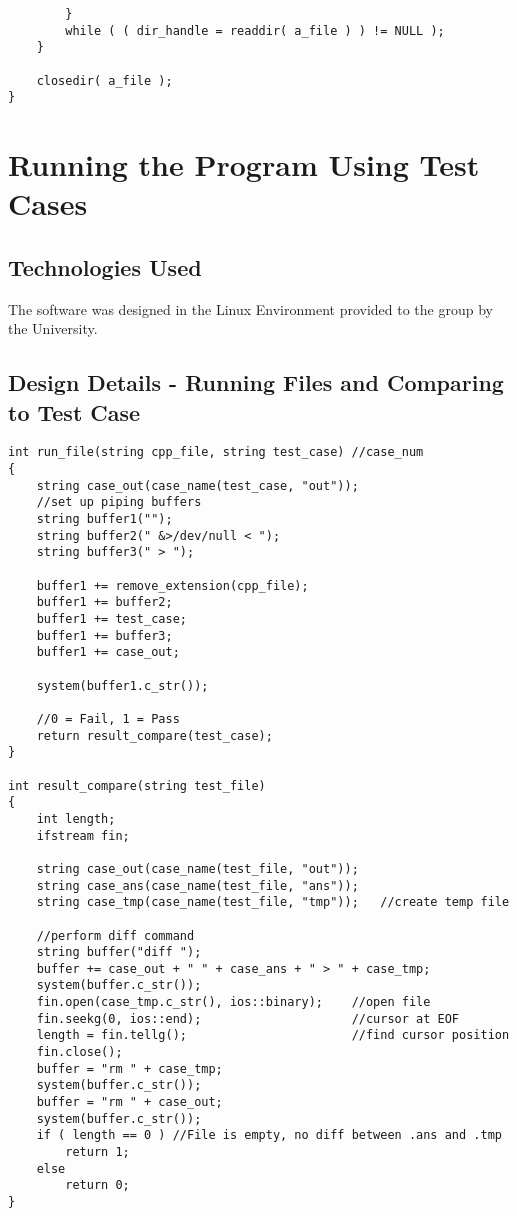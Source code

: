 \begin{lstlisting}
        }
        while ( ( dir_handle = readdir( a_file ) ) != NULL );
    }

    closedir( a_file );
}
\end{lstlisting}

\section{Running the Program Using Test Cases }

\subsection{Technologies  Used}
The software was designed in the Linux Environment provided to the group by the University.



\subsection{Design Details - Running Files and Comparing to Test Case}


\begin{lstlisting}
int run_file(string cpp_file, string test_case) //case_num
{
    string case_out(case_name(test_case, "out"));
    //set up piping buffers
    string buffer1("");
    string buffer2(" &>/dev/null < ");
    string buffer3(" > ");

    buffer1 += remove_extension(cpp_file);
    buffer1 += buffer2;
    buffer1 += test_case;
    buffer1 += buffer3;
    buffer1 += case_out;

    system(buffer1.c_str());

    //0 = Fail, 1 = Pass
    return result_compare(test_case);
}

int result_compare(string test_file)
{
    int length;
    ifstream fin;

    string case_out(case_name(test_file, "out"));
    string case_ans(case_name(test_file, "ans"));
    string case_tmp(case_name(test_file, "tmp"));   //create temp file
    
    //perform diff command
    string buffer("diff ");
    buffer += case_out + " " + case_ans + " > " + case_tmp;
    system(buffer.c_str());    
    fin.open(case_tmp.c_str(), ios::binary);    //open file
    fin.seekg(0, ios::end);                     //cursor at EOF
    length = fin.tellg();                       //find cursor position
    fin.close();
    buffer = "rm " + case_tmp;
    system(buffer.c_str());
    buffer = "rm " + case_out;
    system(buffer.c_str());
    if ( length == 0 ) //File is empty, no diff between .ans and .tmp
        return 1;
    else
        return 0;
}
\end{lstlisting}

